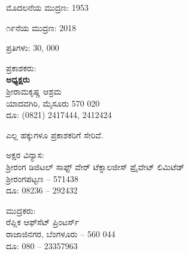 \thispagestyle{empty}

\begin{flushleft}
ಮೊದಲನೆಯ ಮುದ್ರಣ: 1953
\end{flushleft}

\vfill

\begin{flushleft}
೧೯ನೆಯ ಮುದ್ರಣ: 2018
\end{flushleft}

\vfill

\begin{flushleft}
ಪ್ರತಿಗಳು: 30, 000
\end{flushleft}

\vfill


\vfill

\begin{flushleft}
ಪ್ರಕಾಶಕರು:\\\textbf{ಅಧ್ಯಕ್ಷರು}\\ಶ‍್ರೀರಾಮಕೃಷ್ಣ ಆಶ್ರಮ\\ಯಾದವಗಿರಿ, ಮೈಸೂರು 570 020\\ದೂ: (0821) 2417444, 2412424
\end{flushleft}

\vfill

\begin{flushleft}
 ಎಲ್ಲ ಹಕ್ಕುಗಳೂ ಪ್ರಕಾಶಕರಿಗೆ ಸೇರಿವೆ.
\end{flushleft}

\vfill

\begin{flushleft}{\small
ಅಕ್ಷರ ವಿನ್ಯಾಸ:\\ಶ‍್ರೀರಂಗ ಡಿಜಿಟಲ್ ಸಾಫ್ಟ್ ‍ವೇರ್ ಟೆಕ್ನಾಲಜೀಸ್ ಪ್ರೈವೇಟ್ ಲಿಮಿಟೆಡ್\\ಶ‍್ರೀರಂಗಪಟ್ಟಣ – 571438\\ದೂ: 08236 – 292432
}\end{flushleft}

\vfill

\begin{flushleft}{\small
ಮುದ್ರಕರು:\\ರೆಪ್ಲಿಕ ಆಫ್‍ಸೆಟ್ ಪ್ರಿಂಟರ್ಸ್\\ರಾಜಾಜಿನಗರ, ಬೆಂಗಳೂರು – 560 044\\ದೂ: 080 – 23357963
}\end{flushleft}

